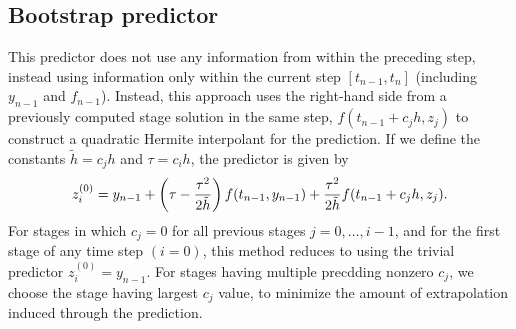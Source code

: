 \documentclass[letterpaper,10pt,english]{sphinxmanual}
\begin{document}
\subsection{Bootstrap predictor}
\label{Mathematics:mathematics-predictors-bootstrap}\label{Mathematics:bootstrap-predictor}
This predictor does not use any information from within the preceding
step, instead using information only within the current step
$[t_{n-1},t_n]$ (including $y_{n-1}$ and
$f_{n-1}$).  Instead, this approach uses the right-hand side
from a previously computed stage solution in the same step,
$f(t_{n-1}+c_j h,z_j)$ to construct a quadratic Hermite
interpolant for the prediction.  If we define the constants
$\tilde{h} = c_j h$ and $\tau = c_i h$, the predictor is
given by
\begin{gather}
\begin{split}z_i^{(0)} = y_{n-1} + \left(\tau - \frac{\tau^2}{2\tilde{h}}\right)
   f(t_{n-1},y_{n-1}) + \frac{\tau^2}{2\tilde{h}} f(t_{n-1}+c_j h,z_j).\end{split}\notag
\end{gather}
For stages in which $c_j=0$ for all previous stages
$j = 0,\ldots,i-1$, and for the first stage of any time step
$(i=0)$, this method reduces to using the trivial predictor
$z_i^{(0)} = y_{n-1}$.  For stages having multiple precdding
nonzero $c_j$, we choose the stage having largest $c_j$
value, to minimize the amount of extrapolation induced through the
prediction.
\end{document}
